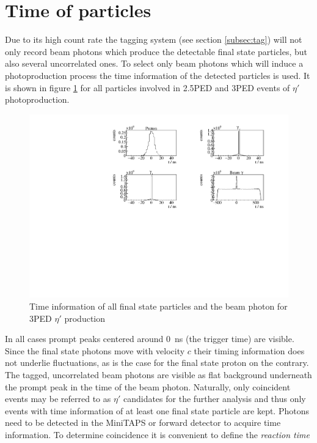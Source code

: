 \section{Time of particles}
\label{sec:time}
Due to its high count rate the tagging system (see section \ref{subsec:tag}) will not only record beam photons which produce the detectable final state particles, but also several uncorrelated ones. To select only beam photons which will induce a photoproduction process the time information of the detected particles is used. It is shown in figure \ref{fig:time} for all particles involved in 2.5PED and 3PED events of $\eta'$ photoproduction. 
\begin{figure}[htbp]
	\centering
	\includegraphics[width=\linewidth]{../figs/hydrogen/time/times.pdf}
	\caption{Time information of all final state particles and the beam photon for 3PED $\eta'$ production}
	\label{fig:time}
\end{figure} 
In all cases prompt peaks centered around \SI{0}{\nano\s} (the trigger time) are visible. Since the final state photons move with velocity $c$ their timing information does not underlie fluctuations, as is the case for the final state proton on the contrary. The tagged, uncorrelated beam photons are visible as flat background underneath the prompt peak in the time of the beam photon. Naturally, only coincident events may be referred to  as $\eta'$ candidates for the further analysis and thus only events with time information of at least one final state particle are kept. Photons need to be detected in the MiniTAPS or forward
detector to acquire time information. To determine coincidence it is convenient to define the \emph{reaction time} 
